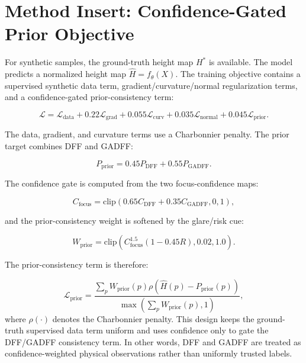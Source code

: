 \documentclass[11pt,a4paper]{article}
\newcommand{\dff}{P_{\mathrm{DFF}}}
\newcommand{\gadff}{P_{\mathrm{GADFF}}}
\begin{document}
\section*{Method Insert: Confidence-Gated Prior Objective}

For synthetic samples, the ground-truth height map \(H^\ast\) is available. The model predicts a normalized height map \(\hat{H}=f_{\theta}(X)\). The training objective contains a supervised synthetic data term, gradient/curvature/normal regularization terms, and a confidence-gated prior-consistency term:

\begin{equation}
\mathcal{L}
= \mathcal{L}_{\mathrm{data}}
 + 0.22\mathcal{L}_{\mathrm{grad}}
 + 0.055\mathcal{L}_{\mathrm{curv}}
 + 0.035\mathcal{L}_{\mathrm{normal}}
 + 0.045\mathcal{L}_{\mathrm{prior}}.
\end{equation}

The data, gradient, and curvature terms use a Charbonnier penalty. The prior target combines DFF and GADFF:

\begin{equation}
P_{\mathrm{prior}}=0.45\dff+0.55\gadff.
\end{equation}

The confidence gate is computed from the two focus-confidence maps:

\begin{equation}
C_{\mathrm{focus}}=\mathrm{clip}(0.65C_{\mathrm{DFF}}+0.35C_{\mathrm{GADFF}},0,1),
\end{equation}

and the prior-consistency weight is softened by the glare/risk cue:

\begin{equation}
W_{\mathrm{prior}}=\mathrm{clip}\left(C_{\mathrm{focus}}^{1.5}(1-0.45R),0.02,1.0\right).
\end{equation}

The prior-consistency term is therefore:

\begin{equation}
\mathcal{L}_{\mathrm{prior}}
=
\frac{\sum_{p} W_{\mathrm{prior}}(p)\rho(\hat{H}(p)-P_{\mathrm{prior}}(p))}
{\max\left(\sum_{p}W_{\mathrm{prior}}(p),1\right)},
\end{equation}
where \(\rho(\cdot)\) denotes the Charbonnier penalty. This design keeps the ground-truth supervised data term uniform and uses confidence only to gate the DFF/GADFF consistency term. In other words, DFF and GADFF are treated as confidence-weighted physical observations rather than uniformly trusted labels.
\end{document}
